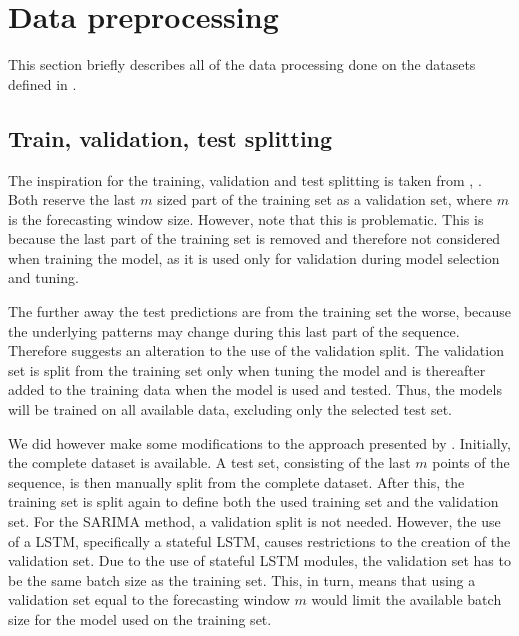 \section{Data preprocessing}
\label{section:Method:Preprocessing}
This section briefly describes all of the data processing done on the datasets defined in .

\subsection{Train, validation, test splitting}

The inspiration for the training, validation and test splitting is taken from
\cite{Bandara2019}, \cite{Hewamalage2021}.
Both reserve the last $m$ sized part of the training set as a validation set,
where $m$ is the forecasting window size.
However, \cite{Hewamalage2021} note that this is problematic.
This is because the last part of the training set is removed
and therefore not considered when training the model, as it is used only for validation during model selection and tuning.

The further away the test predictions are from the training set the worse,
because the underlying patterns may change during this last part of the sequence.
Therefore \cite{Hewamalage2021} suggests an alteration to the use of the validation split.
The validation set is split from the training set only when tuning the model
and is thereafter added to the training data when the model is used and tested.
Thus, the models will be trained on all available data, excluding only the selected test set.

We did however make some modifications to the approach presented by \cite{Hewamalage2021}.
Initially, the complete dataset is available.
A test set, consisting of the last $m$ points of the sequence, is then manually split from the complete dataset.
After this, the training set is split again to define both the used training set and the validation set.
For the SARIMA method, a validation split is not needed.
However, the use of a LSTM, specifically a stateful LSTM, causes restrictions to the creation of the validation set.
Due to the use of stateful LSTM modules, the validation set has to be the same batch size as the training set.
This, in turn, means that using a validation set equal to the forecasting window $m$ would limit the available batch size for the model
used on the training set.

